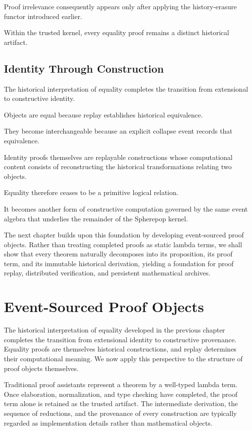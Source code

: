 \documentclass[12pt,oneside]{article}
\theoremstyle{definition}
\theoremstyle{remark}
\begin{document}
Proof irrelevance consequently appears only after applying the history-erasure
functor introduced earlier.

Within the trusted kernel, every equality proof remains a distinct historical
artifact.

\subsection{Identity Through Construction}

The historical interpretation of equality completes the transition from
extensional to constructive identity.

Objects are equal because replay establishes historical equivalence.

They become interchangeable because an explicit collapse event records that
equivalence.

Identity proofs themselves are replayable constructions whose computational
content consists of reconstructing the historical transformations relating two
objects.

Equality therefore ceases to be a primitive logical relation.

It becomes another form of constructive computation governed by the same event
algebra that underlies the remainder of the Spherepop kernel.

The next chapter builds upon this foundation by developing event-sourced proof
objects. Rather than treating completed proofs as static lambda terms, we shall
show that every theorem naturally decomposes into its proposition, its proof
term, and its immutable historical derivation, yielding a foundation for proof
replay, distributed verification, and persistent mathematical archives.

\section{Event-Sourced Proof Objects}

The historical interpretation of equality developed in the previous chapter
completes the transition from extensional identity to constructive provenance.
Equality proofs are themselves historical constructions, and replay determines
their computational meaning. We now apply this perspective to the structure of
proof objects themselves.

Traditional proof assistants represent a theorem by a well-typed lambda term.
Once elaboration, normalization, and type checking have completed, the proof
term alone is retained as the trusted artifact. The intermediate derivation,
the sequence of reductions, and the provenance of every construction are
typically regarded as implementation details rather than mathematical objects.
\end{document}
